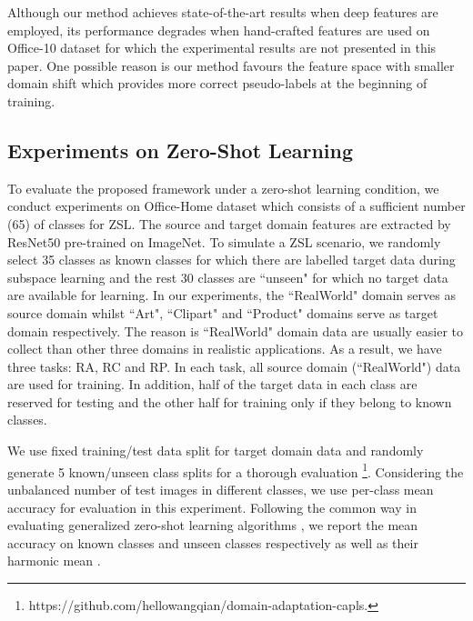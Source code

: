 \documentclass[conference]{IEEEtran}
\begin{document}
Although our method achieves state-of-the-art results when deep features are employed, its performance degrades when hand-crafted features are used on Office-10 dataset for which the experimental results are not presented in this paper. One possible reason is our method favours the feature space with smaller domain shift which provides more correct pseudo-labels at the beginning of training.
\subsection{Experiments on Zero-Shot Learning}\label{sec:exp_zsl}

To evaluate the proposed framework under a zero-shot learning condition, we conduct experiments on Office-Home dataset which consists of a sufficient number (65) of classes for ZSL. The source and target domain features are extracted by ResNet50 pre-trained on ImageNet. To simulate a ZSL scenario, we randomly select 35 classes as known classes for which there are labelled target data during subspace learning and the rest 30 classes are ``unseen" for which no target data are available for learning. In our experiments, the ``RealWorld" domain serves as source domain whilst ``Art", ``Clipart" and ``Product" domains serve as target domain respectively. The reason is ``RealWorld" domain data are usually easier to collect than other three domains in realistic applications. As a result, we have three tasks: RA, RC and RP. In each task, all source domain (``RealWorld") data are used for training. In addition, half of the target data in each class are reserved for testing and the other half for training only if they belong to known classes.

We use fixed training/test data split for target domain data and randomly generate 5 known/unseen class splits for a thorough evaluation \footnote{https://github.com/hellowangqian/domain-adaptation-capls.}. Considering the unbalanced number of test images in different classes, we use per-class mean accuracy for evaluation in this experiment. Following the common way in evaluating generalized zero-shot learning algorithms \cite{xian2018zero}, we report the mean accuracy on known classes  and unseen classes  respectively as well as their harmonic mean .
\end{document}
